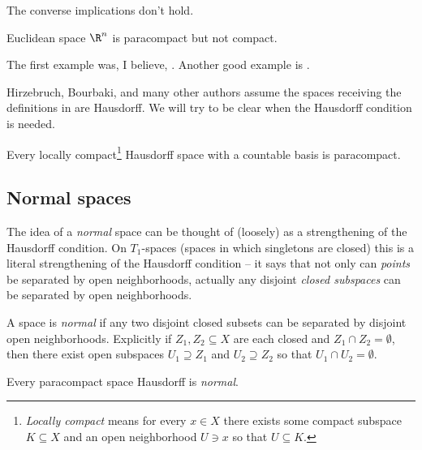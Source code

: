\documentclass[11pt]{amsart}
\begin{document}
The converse implications don't hold.

\begin{example} Euclidean space $\R^n$ is paracompact but not compact.
\end{example}

\begin{example} The first example was, I believe, \cite[Example~B]{bingMetrizationTopologicalSpaces1951}. Another good example is \cite[Example~89]{steeinCounterexamplesTopology1978}.
\end{example}

\begin{remark} Hirzebruch, Bourbaki, and many other authors assume the spaces receiving the definitions in  are Hausdorff. We will try to be clear when the Hausdorff condition is needed.
\end{remark}

\begin{theorem} Every locally compact\footnote{\emph{Locally compact} means for every $x\in X$ there exists some compact subspace $K \subseteq X$ and an open neighborhood $U\ni x$ so that $U \subseteq K$.} Hausdorff space with a countable basis is paracompact.
\end{theorem}

\subsection{Normal spaces}

The idea of a \emph{normal} space can be thought of (loosely) as a strengthening of the Hausdorff condition. On $T_1$-spaces (spaces in which singletons are closed) this is a literal strengthening of the Hausdorff condition -- it says that not only can \emph{points} be separated by open neighborhoods, actually any disjoint \emph{closed subspaces} can be separated by open neighborhoods.

\begin{definition}\label{def:normal}
A space is \emph{normal} if any two disjoint closed subsets can be separated by disjoint open neighborhoods. Explicitly if $Z_1,Z_2 \subseteq X$ are each closed and $Z_1 \cap Z_2 = \emptyset$, then there exist open subspaces $U_1 \supseteq Z_1$ and $U_2 \supseteq Z_2$ so that $U_1 \cap U_2 = \emptyset$.
\end{definition}

\begin{theorem} Every paracompact space Hausdorff is \emph{normal}.
\end{theorem}
\end{document}
